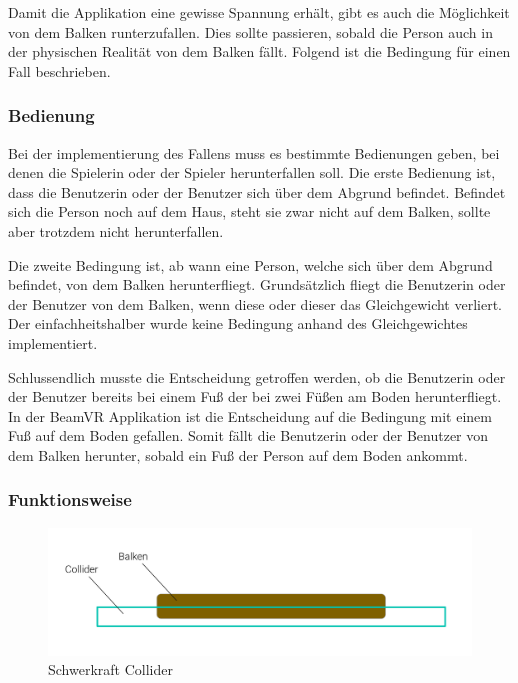 Damit die Applikation eine gewisse Spannung erhält, gibt es auch die Möglichkeit von dem Balken runterzufallen.
Dies sollte passieren, sobald die Person auch in der physischen Realität von dem Balken fällt.
Folgend ist die Bedingung für einen Fall beschrieben.

\subsubsection{Bedienung}

Bei der implementierung des Fallens muss es bestimmte Bedienungen geben, bei denen die Spielerin oder der Spieler herunterfallen soll.
Die erste Bedienung ist, dass die Benutzerin oder der Benutzer sich über dem Abgrund befindet.
Befindet sich die Person noch auf dem Haus, steht sie zwar nicht auf dem Balken, sollte aber trotzdem nicht herunterfallen.

Die zweite Bedingung ist, ab wann eine Person, welche sich über dem Abgrund befindet, von dem Balken herunterfliegt.
Grundsätzlich fliegt die Benutzerin oder der Benutzer von dem Balken, wenn diese oder dieser das Gleichgewicht verliert.
Der einfachheitshalber wurde keine Bedingung anhand des Gleichgewichtes implementiert.

Schlussendlich musste die Entscheidung getroffen werden, ob die Benutzerin oder der Benutzer bereits bei einem Fuß der bei zwei Füßen am Boden herunterfliegt.
In der BeamVR Applikation ist die Entscheidung auf die Bedingung mit einem Fuß auf dem Boden gefallen.
Somit fällt die Benutzerin oder der Benutzer von dem Balken herunter, sobald ein Fuß der Person auf dem Boden ankommt.

\subsubsection{Funktionsweise}

\begin{figure}
    \centering
    \includegraphics[scale=0.2]{pics/gravitation_collider}
    \caption{Schwerkraft Collider}
    \label{fig:gravitation-collider}
\end{figure}


